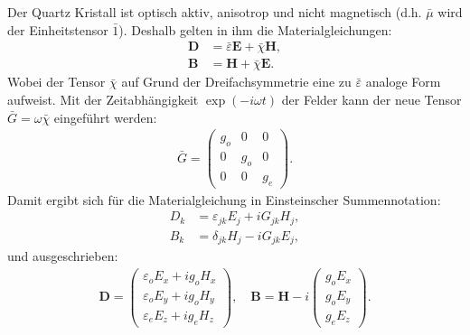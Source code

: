 \documentclass[twocolumn,10pt,DIV18]{scrartcl}
\renewcommand{\v}[1]{{\mathbf #1}} %
\newcommand{\T}[1]{{\bar #1}} %
\newcommand{\E}{\v E}
\newcommand{\eps}{\varepsilon}
\newcommand{\D}{\v D}
\newcommand{\B}{\v B}
\renewcommand{\H}{\v H}
\renewcommand{\[}{\left[}
\renewcommand{\]}{\right]}
\renewcommand{\(}{\left(}
\renewcommand{\)}{\right)}
\begin{document}
  Der Quartz Kristall ist optisch aktiv, anisotrop und nicht
  magnetisch (d.h. $\T\mu$ wird der Einheitstensor $\T 1$). Deshalb
  gelten in ihm die Materialgleichungen:
  \begin{align}
    \D&=\T\eps\E+\T\chi\H,\\
    \B&=\H+\T\chi\E.
  \end{align}
  Wobei der Tensor $\T\chi$ auf Grund der Dreifachsymmetrie eine zu
  $\T\eps$ analoge Form aufweist. Mit der Zeitabh\"angigkeit
  $\exp(-i\omega t)$ der Felder kann der neue Tensor $\T
  G=\omega\T\chi$ eingef\"uhrt werden:
  \begin{align}
    \T G=\begin{pmatrix}
    g_o&0&0\\
    0&g_o&0\\
    0&0&g_e
    \end{pmatrix}.
  \end{align}
  Damit ergibt sich f\"ur die Materialgleichung in Einsteinscher
  Summennotation:
  \begin{align}
    D_k&=\eps_{jk}E_j+iG_{jk}H_j,\\
    B_k&=\delta_{jk}H_j-iG_{jk}E_j,
  \end{align}
  und ausgeschrieben:
  \begin{align}
    \D=\begin{pmatrix}
    \eps_o E_x+ig_oH_x\\
    \eps_o E_y+ig_oH_y\\
    \eps_e E_z+ig_eH_z
    \end{pmatrix},\quad
    \B=\H-i\begin{pmatrix}
    g_oE_x\\
    g_oE_y\\
    g_eE_z
    \end{pmatrix}.
  \end{align}
\end{document}
